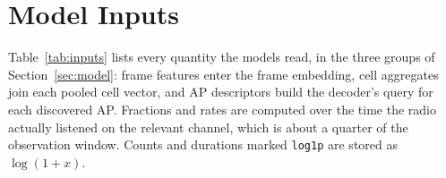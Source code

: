 \documentclass[conference]{IEEEtran}
\newcommand{\code}[1]{\texttt{\small #1}}
\begin{document}
\appendices
\section{Model Inputs}
\label{app:inputs}

Table~\ref{tab:inputs} lists every quantity the models read, in the three
groups of Section~\ref{sec:model}: frame features enter the frame embedding,
cell aggregates join each pooled cell vector, and AP descriptors build the
decoder's query for each discovered AP. Fractions and rates are computed over
the time the radio actually listened on the relevant channel, which is about a
quarter of the observation window. Counts and durations marked \code{log1p}
are stored as $\log(1+x)$.
\end{document}
